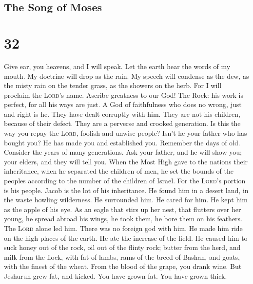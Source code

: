 \hypertarget{the-song-of-moses}{%
\subsection{The Song of Moses}\label{the-song-of-moses}}

\hypertarget{section-31}{%
\section{32}\label{section-31}}

 Give ear, you heavens, and I will speak. Let the earth
hear the words of my mouth.  My doctrine will drop as the
rain. My speech will condense as the dew, as the misty rain on the
tender grass, as the showers on the herb.  For I will
proclaim the \textsc{Lord}'s name. Ascribe greatness to our God!
 The Rock: his work is perfect, for all his ways are just.
A God of faithfulness who does no wrong, just and right is he.
 They have dealt corruptly with him. They are not his
children, because of their defect. They are a perverse and crooked
generation.  Is this the way you repay the \textsc{Lord},
foolish and unwise people? Isn't he your father who has bought you? He
has made you and established you.  Remember the days of
old. Consider the years of many generations. Ask your father, and he
will show you; your elders, and they will tell you.  When
the Most High gave to the nations their inheritance, when he separated
the children of men, he set the bounds of the peoples according to the
number of the children of Israel.  For the \textsc{Lord}'s
portion is his people. Jacob is the lot of his inheritance.
 He found him in a desert land, in the waste howling
wilderness. He surrounded him. He cared for him. He kept him as the
apple of his eye.  As an eagle that stirs up her nest,
that flutters over her young, he spread abroad his wings, he took them,
he bore them on his feathers.  The \textsc{Lord} alone
led him. There was no foreign god with him.  He made him
ride on the high places of the earth. He ate the increase of the field.
He caused him to suck honey out of the rock, oil out of the flinty rock;
 butter from the herd, and milk from the flock, with fat
of lambs, rams of the breed of Bashan, and goats, with the finest of the
wheat. From the blood of the grape, you drank wine.  But
Jeshurun grew fat, and kicked. You have grown fat. You have grown thick.
